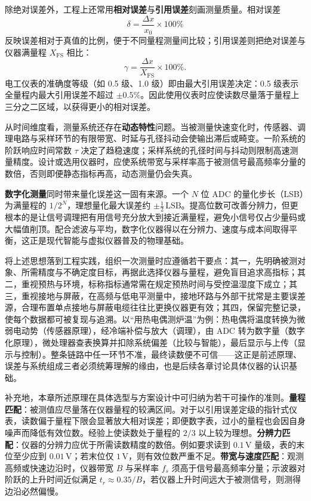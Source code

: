 除绝对误差外，工程上还常用\textbf{相对误差}与\textbf{引用误差}刻画测量质量。相对误差
\[
    \delta = \frac{\Delta x}{x_0}\times 100\%
\]
反映误差相对于真值的比例，便于不同量程测量间比较；引用误差则把绝对误差与仪器满量程 $X_{\mathrm{FS}}$ 相比：
\[
    \gamma = \frac{\Delta x}{X_{\mathrm{FS}}}\times 100\% .
\]
电工仪表的准确度等级（如 0.5 级、1.0 级）即由最大引用误差决定：0.5 级表示全量程内最大引用误差不超过 $\pm 0.5\%$。因此使用仪表时应使读数尽量落于量程上三分之二区域，以获得更小的相对误差。

从时间维度看，测量系统还存在\textbf{动态特性}问题。当被测量快速变化时，传感器、调理电路与采样环节的有限带宽、时延与孔径抖动会使输出滞后或畸变。一阶系统的阶跃响应时间常数 $\tau$ 决定了趋稳速度；采样系统的孔径时间与抖动则限制高速测量精度。设计或选用仪器时，应使系统带宽与采样率高于被测信号最高频率分量的数倍，否则即便静态指标再高，动态测量仍会失真。

\textbf{数字化测量}同时带来量化误差这一固有来源。一个 $N$ 位 ADC 的量化步长（LSB）为满量程的 $1/2^N$，理想量化最大误差约 $\pm\tfrac{1}{2}\,\mathrm{LSB}$。提高位数可改善分辨力，但更根本的是让信号调理把有用信号充分放大到接近满量程，避免小信号仅占少量码或大幅值削顶。配合滤波与平均，数字化仪器得以在分辨力、速度与成本间取得平衡，这正是现代智能与虚拟仪器普及的物理基础。

将上述思想落到工程实践，组织一次测量时应遵循若干要点：其一，先明确被测对象、所需精度与不确定度目标，再据此选择仪器与量程，避免盲目追求高指标；其二，重视预热与环境，标称指标通常需在规定预热时间与受控温湿度下成立；其三，重视接地与屏蔽，在高频与低电平测量中，接地环路与外部干扰常是主要误差源，合理布置单点接地与屏蔽电缆往往比更换仪器更有效；其四，保留完整记录，使每个数据都可被复现与追溯。以“用热电偶测炉温”为例：热电偶将温度转换为微弱电动势（传感器原理），经冷端补偿与放大（调理），由 ADC 转为数字量（数字化原理），微处理器查表换算并扣除系统偏差（比较与智能），最后显示与上传（显示与控制）。整条链路中任一环节不准，最终读数便不可信——这正是前述原理、误差与系统组成三者必须统筹理解的缘由，也是后续各章讨论具体仪器的认识基础。

补充地，本章所述原理在具体选型与方案设计中可归纳为若干可操作的准则。\textbf{量程匹配}：被测值应尽量落在仪器量程的较满区间。对于以引用误差定级的指针式仪表，读数偏于量程下限会显著放大相对误差；即便数字表，过小的量程也会因自身噪声而降低有效位数。经验上使读数处于量程的 $2/3$ 以上较为理想。\textbf{分辨力匹配}：仪器的分辨力应优于所需读数精度的数倍。例如要求读到 $0.1\,\mathrm{V}$ 量级，表的末位至少应到 $0.01\,\mathrm{V}$；若末位仅 $1\,\mathrm{V}$，则有效位数严重不足。\textbf{带宽与速度匹配}：观测高频或快速边沿时，仪器带宽 $B$ 与采样率 $f_s$ 须高于信号最高频率分量；示波器对阶跃的上升时间近似满足 $t_r\approx 0.35/B$，若仪器上升时间远大于被测信号，则测得边沿必然偏慢。

